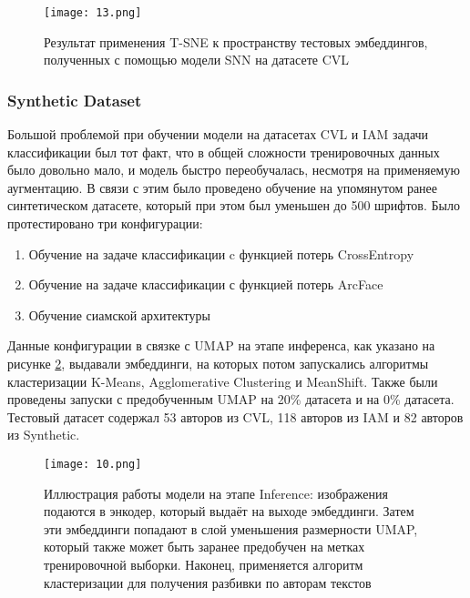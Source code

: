 \begin{figure}[htbp]
    \centering
    \texttt{[image: 13.png]}
    \captionsetup{width=0.9\textwidth}
    \caption{Результат применения T-SNE к пространству тестовых эмбеддингов, полученных с помощью модели SNN на датасете CVL}
    \label{fig:snn_experiment_2}
\end{figure}

\subsubsection{Synthetic Dataset}

Большой проблемой при обучении модели на датасетах CVL и IAM задачи классификации был тот факт, что в общей сложности тренировочных данных было довольно мало, и модель быстро переобучалась, несмотря на применяемую аугментацию. В связи с этим было проведено обучение на упомянутом ранее синтетическом датасете, который при этом был уменьшен до 500 шрифтов. Было протестировано три конфигурации:

\begin{enumerate}
    \item Обучение на задаче классификации c функцией потерь CrossEntropy
    \item Обучение на задаче классификации с функцией потерь ArcFace
    \item Обучение сиамской архитектуры
\end{enumerate}

Данные конфигурации в связке с UMAP на этапе инференса, как указано на рисунке \ref{fig:inference}, выдавали эмбеддинги, на которых потом запускались алгоритмы кластеризации K-Means, Agglomerative Clustering и MeanShift. Также были проведены запуски с предобученным UMAP на 20\% датасета и на 0\% датасета. Тестовый датасет содержал 53 авторов из CVL, 118 авторов из IAM и 82 авторов из Synthetic.

\begin{figure}[htbp]
    \centering
    \texttt{[image: 10.png]}
    \captionsetup{width=0.9\textwidth}
    \caption{Иллюстрация работы модели на этапе Inference: изображения подаются в энкодер, который выдаёт на выходе эмбеддинги. Затем эти эмбеддинги попадают в слой уменьшения размерности UMAP, который также может быть заранее предобучен на метках тренировочной выборки. Наконец, применяется алгоритм кластеризации для получения разбивки по авторам текстов}
    \label{fig:inference}
\end{figure}

